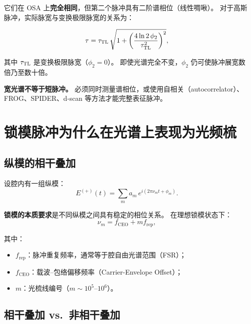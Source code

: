 \documentclass[11pt,a4paper]{article}
\newcommand{\rep}{f_{\text{rep}}}
\newcommand{\ceo}{f_{\text{CEO}}}
\begin{document}
它们在 OSA 上\textbf{完全相同}，但第二个脉冲具有二阶谱相位（线性啁啾）。
对于高斯脉冲，实际脉宽与变换极限脉宽的关系为：

\begin{equation}\label{eq:chirped_width}
\tau = \tau_{\rm TL}\,
\sqrt{1 + \left(\frac{4\ln 2\,\phi_2}{\tau_{\rm TL}^2}\right)^2},
\end{equation}

其中 $\tau_{\rm TL}$ 是变换极限脉宽（$\phi_2 = 0$）。
即使光谱完全不变，$\phi_2$ 仍可使脉冲展宽数倍乃至数十倍。

\begin{tcolorbox}[width=0.92\textwidth, colback=red!3, colframe=red!50,
    title=重要结论]
\textbf{宽光谱不等于短脉冲。}
必须同时测量谱相位，或使用自相关（autocorrelator）、FROG、SPIDER、d-scan
等方法才能完整表征脉冲。
\end{tcolorbox}

\section{锁模脉冲为什么在光谱上表现为光频梳}

\subsection{纵模的相干叠加}

设腔内有一组纵模：
\begin{equation}\label{eq:longitudinal_modes}
E^{(+)}(t) = \sum_m a_m\,e^{i(2\pi\nu_m t + \phi_m)}.
\end{equation}

\textbf{锁模的本质要求}是不同纵模之间具有稳定的相位关系。
在理想锁模状态下：
\begin{equation}\label{eq:comb_freqs}
\nu_m = \ceo + m\rep,
\end{equation}

其中：
\begin{itemize}
    \item $\rep$：脉冲重复频率，通常等于腔自由光谱范围（FSR）；
    \item $\ceo$：载波--包络偏移频率（Carrier-Envelope Offset）；
    \item $m$：光梳线编号（$m \sim 10^5\text{--}10^6$）。
\end{itemize}

\subsection{相干叠加 vs.\ 非相干叠加}
\end{document}
